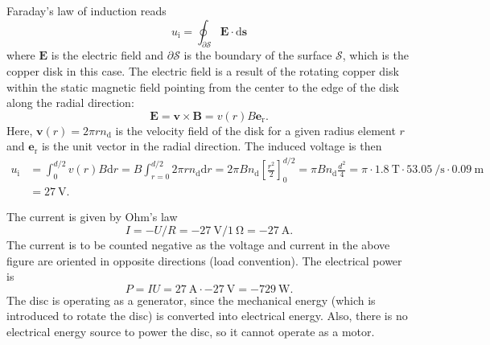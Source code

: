 \begin{solutionblock}
    Faraday's law of induction reads 
    $$u_\mathrm{i} =\oint_{\partial\mathcal{S}} \bm{E} \cdot \mathrm{d}\bm{s}$$ 
    where $\bm{E}$ is the electric field and $\partial\mathcal{S}$ is the boundary of the surface $\mathcal{S}$, which is the copper disk in this case. The electric field is a result of the rotating copper disk within the static magnetic field pointing from the center to the edge of the disk along the radial direction:
    $$\bm{E} = \bm{v} \times \bm{B} = v(r) B \bm{e}_\mathrm{r} .$$
    Here, $\bm{v}(r) = 2 \pi r n_\mathrm{d}$ is the velocity field of the disk for a given radius element $r$ and $\bm{e}_\mathrm{r}$ is the unit vector in the radial direction. The induced voltage is then
    \begin{align*}
        u_\mathrm{i} &= \int_{0}^{d/2} v(r) B \mathrm{d}r = B \int_{r=0}^{d/2} 2 \pi r n_\mathrm{d} \mathrm{d}r = 2 \pi Bn_\mathrm{d} \left[\frac{r^2}{2}\right]_{0}^{d/2} = \pi B n_\mathrm{d} \frac{d^2}{4} = \pi \cdot \SI{1.8}{\tesla} \cdot \SI{53.05}{\per\second}\cdot \SI{0.09}{\meter} \\&= \SI{27}{\volt}.
    \end{align*}
\end{solutionblock}


\begin{solutionblock}
    The current is given by Ohm's law $$I = -U/R = \SI{-27}{\volt}/\SI{1}{\ohm} = \SI{-27}{\ampere}.$$ The current is to be counted negative as the voltage and current in the above figure are oriented in opposite directions (load convention). The electrical power is $$P = I U = \SI{27}{\ampere} \cdot \SI{-27}{\volt} = \SI{-729}{\watt}.$$ The disc is operating as a generator, since the mechanical energy (which is introduced to rotate the disc) is converted into electrical energy. Also, there is no electrical energy source to power the disc, so it cannot operate as a motor.
\end{solutionblock}



